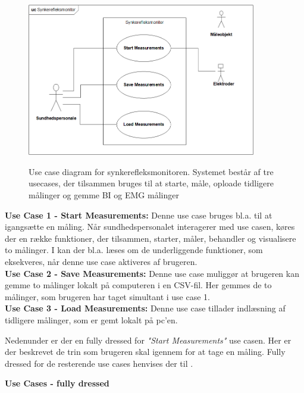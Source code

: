 \begin{figure}[H]
\centering
{\includegraphics[width=10cm]
{Figure/usecasediagram}}
\caption{Use case diagram for synkerefleksmonitoren. Systemet består af tre usecases, der tilsammen bruges til at starte, måle, oploade tidligere målinger og gemme BI og EMG målinger}
\label{UseCaseV1}
\end{figure}

\textbf{Use Case 1 - Start Measurements:}
Denne use case bruges bl.a. til at igangsætte en måling. Når sundhedspersonalet interagerer med use casen, køres der en række funktioner, der tilsammen, starter, måler, behandler og visualisere to målinger. I   kan der bl.a. læses om de underliggende funktioner, som eksekveres, når denne use case aktiveres af brugeren.\\

\textbf{Use Case 2 - Save Measurements:}
Denne use case muliggør at brugeren kan gemme to målinger lokalt på computeren i en CSV-fil. Her gemmes de to målinger, som brugeren har taget simultant i use case 1. \\
 
\textbf{Use Case 3  - Load Measurements:} 
Denne use case tillader indlæsning af tidligere målinger, som er gemt lokalt på pc'en.  
 
 
 
 
 
 \pagebreak
Nedenunder er der en fully dressed for \textit{"Start Measurements"} use casen. Her er der beskrevet de trin som brugeren skal igennem for at tage en måling. Fully dressed for de resterende use cases henvises der til . 

\textbf{Use Cases - fully dressed  } 


